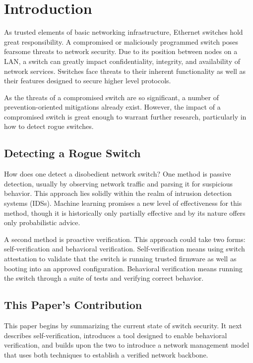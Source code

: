 \documentclass[journal]{IEEEtran}
\begin{document}
\section{Introduction}

As trusted elements of basic networking infrastructure, Ethernet switches hold great
responsibility. A compromised or maliciously programmed switch poses fearsome threats to network
security. Due to its position between nodes on a LAN, a switch can greatly impact confidentiality,
integrity, and availability of network services. Switches face threats to their inherent
functionality as well as their features designed to secure higher level protocols.

As the threats of a compromised switch are so significant, a number of prevention-oriented
mitigations already exist. However, the impact of a compromised switch is great enough to warrant
further research, particularly in how to detect rogue switches.

\subsection{Detecting a Rogue Switch}
How does one detect a disobedient network switch? One method is passive detection, usually by
observing network traffic and parsing it for suspicious behavior. This approach lies solidly within
the realm of intrusion detection systems (IDSs). Machine learning promises a new level of
effectiveness for this method, though it is historically only partially effective and by its nature
offers only probabilistic advice.

A second method is proactive verification. This approach could take two forms: self-verification
and behavioral verification. Self-verification means using switch attestation to validate that the
switch is running trusted firmware as well as booting into an approved configuration. Behavioral
verification means running the switch through a suite of tests and verifying correct behavior.

\subsection{This Paper's Contribution}
This paper begins by summarizing the current state of switch security. It next describes
self-verification, introduces a tool designed to enable behavioral verification, and builds upon the
two to introduce a network management model that uses both techniques to establish a verified
network backbone.
\end{document}
